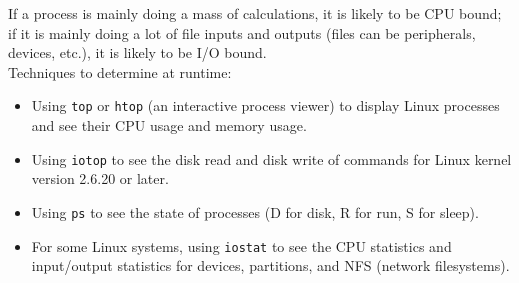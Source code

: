 \documentclass[a4paper]{article}
\begin{document}
\begin{enumerate}
    If a process is mainly doing a mass of calculations, it is likely to be CPU bound; if it is mainly doing a lot of file inputs and outputs (files can be peripherals, devices, etc.), it is likely to be I/O bound.\\
    Techniques to determine at runtime:\\
    \begin{itemize}
        \item Using \texttt{top} or \texttt{htop} (an interactive process viewer) to display Linux processes and see their CPU usage and memory usage.
        \item Using \texttt{iotop} to see the disk read and disk write of commands for Linux kernel version 2.6.20 or later.
        \item Using \texttt{ps} to see the state of processes (D for disk, R for run, S for sleep).
        \item For some Linux systems, using \texttt{iostat} to see the CPU statistics and input/output statistics for devices, partitions, and NFS (network filesystems).
    \end{itemize}
\end{enumerate}
\end{document}
